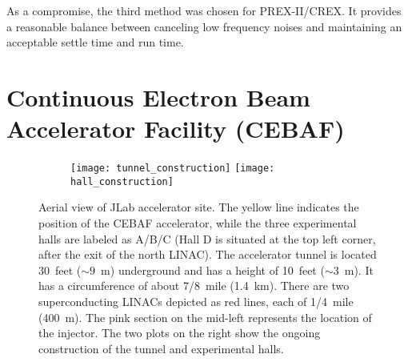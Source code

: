 As a compromise, the third method was chosen for PREX-II/CREX. It provides a reasonable balance between canceling low frequency noises and maintaining an acceptable settle time and run time.

\section{Continuous Electron Beam Accelerator Facility (CEBAF)}
\begin{figure}[!h]
    \begin{subfigure}[b]{0.59\textwidth}
    \end{subfigure}
    \begin{subfigure}[b]{0.5\textwidth}
	\texttt{[image: tunnel\_construction]}
	\texttt{[image: hall\_construction]}
    \end{subfigure}

    \caption[JLab aerial view]
    {Aerial view of JLab accelerator site. The yellow line indicates the position
    of the CEBAF accelerator, while the three experimental halls are labeled as A/B/C 
    (Hall D is situated at the top left corner, after the exit of the north LINAC).
    The accelerator tunnel is located 30~feet ($\sim 9$~m) underground and has 
    a height of 10~feet ($\sim 3$~m). It has a circumference of about 7/8~mile (1.4~km). 
    There are two superconducting LINACs depicted as red lines, each of 1/4~mile (400~m). 
    The pink section on the mid-left represents the location of the injector. 
    The two plots on the right show the ongoing construction of the tunnel and 
    experimental halls.}
\end{figure}

